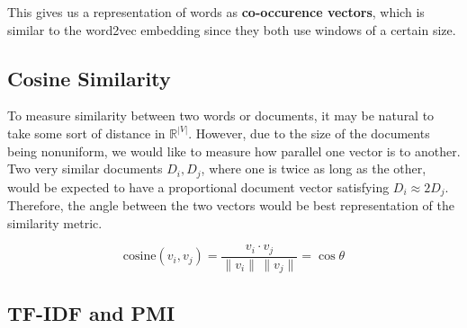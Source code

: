 \documentclass{article}
\begin{document}
      This gives us a representation of words as \textbf{co-occurence vectors}, which is similar to the word2vec embedding since they both use windows of a certain size. 

  \subsection{Cosine Similarity}

    To measure similarity between two words or documents, it may be natural to take some sort of distance in $\mathbb{R}^{|V|}$. However, due to the size of the documents being nonuniform, we would like to measure how parallel one vector is to another. Two very similar documents $D_i, D_j$, where one is twice as long as the other, would be expected to have a proportional document vector satisfying $D_i \approx 2 D_j$. Therefore, the angle between the two vectors would be best representation of the similarity metric. 

    \begin{equation}
      \mathrm{cosine}(v_i, v_j) = \frac{v_i \cdot v_j}{\|v_i\| \, \|v_j\|} = \cos{\theta}
    \end{equation}

  \subsection{TF-IDF and PMI}
\end{document}
